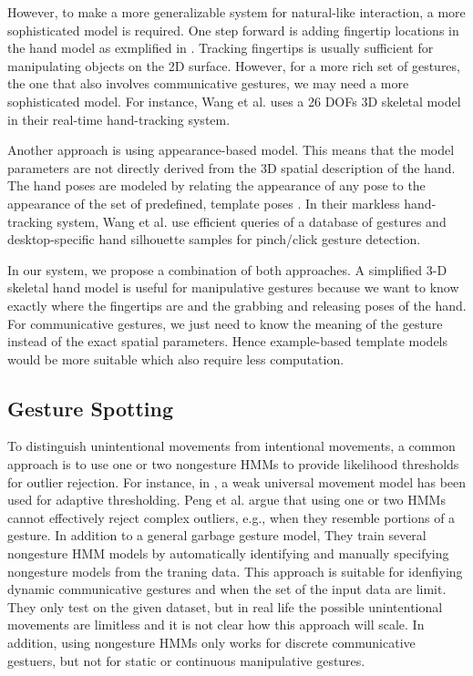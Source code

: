 However, to make a more generalizable system for natural-like interaction, a
more sophisticated model is required. One step forward is adding fingertip
locations in the hand model as exmplified in \cite{Oka02} \cite{harrison11}
\cite{larson11}. Tracking fingertips is usually sufficient for manipulating
objects on the 2D surface. However, for a more rich set of gestures, the one
that also involves communicative gestures, we may need a more sophisticated
model. For instance, Wang et al. \cite{Wang09} uses a 26 DOFs
3D skeletal model in their real-time hand-tracking system. 

Another approach is using appearance-based model. This means that the model
parameters are not directly derived from the 3D spatial description of the hand.
The hand poses are modeled by relating the appearance of any pose to the 
appearance of the set of predefined, template poses \cite{Pavlovic97}. In
their markless hand-tracking system, Wang et al. \cite{wang11} use efficient
queries of a database of gestures and desktop-specific hand silhouette samples
for pinch/click gesture detection.

In our system, we propose a combination of both approaches. A simplified 3-D
skeletal hand model is useful for manipulative gestures because we want to know 
exactly where the fingertips are and the grabbing and releasing poses of the hand. For
communicative gestures, we just need to know the meaning of the gesture instead
of the exact spatial parameters. Hence example-based template models would be
more suitable which also require less computation.

\subsection{Gesture Spotting}
To distinguish unintentional movements from intentional
movements, a common approach is to use one or two nongesture HMMs to
provide likelihood thresholds for outlier rejection. For instance, in \cite{yang07}, a weak
universal movement model has been used for adaptive thresholding.
Peng et al. \cite{peng11} argue that using one or two HMMs cannot
effectively reject complex outliers, e.g., when they resemble portions of a
gesture. In addition to a general garbage gesture model, They train several nongesture HMM models by
automatically identifying and manually specifying nongesture models from the
traning data. This approach is suitable for idenfiying dynamic communicative
gestures and when the set of the input data are limit. They only test on the
given dataset, but in real life the possible unintentional movements are
limitless and it is not clear how this approach will scale. In addition,
using nongesture HMMs only works for discrete communicative gestuers, but not
for static or continuous manipulative gestures.

